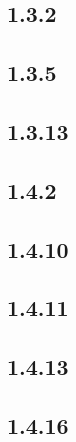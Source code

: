 \documentclass{article}
\begin{document}
\subsection*{1.3.2}



\subsection*{1.3.5}



\subsection*{1.3.13}



\subsection*{1.4.2}



\subsection*{1.4.10}



\subsection*{1.4.11}



\subsection*{1.4.13}



\subsection*{1.4.16}
\end{document}
